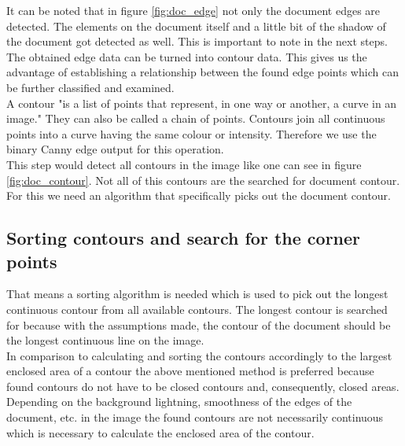\vspace{-3mm}
It can be noted that in figure \ref{fig:doc_edge} not only the document edges are detected. The elements on the document itself and a little bit of the shadow of the document got detected as well. This is important to note in the next steps.\\

The obtained edge data can be turned into contour data. This gives us the advantage of establishing a relationship between the found edge points which can be further classified and examined.\\

A contour "is a list of points that represent, in one way or another, a curve in an image." \cite{oreily} They can also be called a chain of points. Contours join all continuous points into a curve having the same colour or intensity. Therefore we use the binary Canny edge output for this operation. \cite{oreily} \cite{contour}\\

This step would detect all contours in the image like one can see in figure \ref{fig:doc_contour}. Not all of this contours are the searched for document contour. For this we need an algorithm that specifically picks out the document contour.\\


\subsection{Sorting contours and search for the corner points}

That means a sorting algorithm is needed which is used to pick out the longest continuous contour from all available contours. The longest contour is searched for because with the assumptions made, the contour of the document should be the longest continuous line on the image. \\

In comparison to calculating and sorting the contours accordingly to the largest enclosed area of a contour the above mentioned method is preferred because found contours do not have to be closed contours and, consequently, closed areas. \\
Depending on the background lightning, smoothness of the edges of the document, etc. in the image the found contours are not necessarily continuous which is necessary to calculate the enclosed area of the contour.\\

